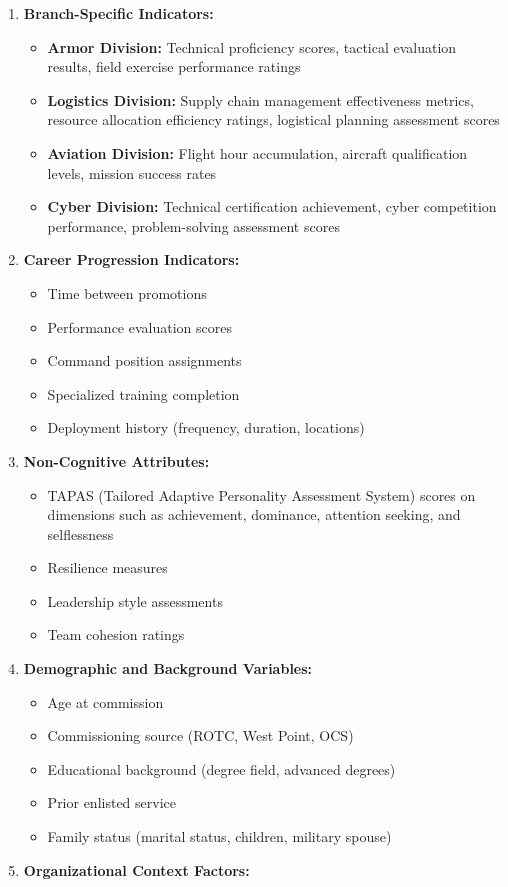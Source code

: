 \documentclass[
  letterpaper,
  DIV=11,
  numbers=noendperiod]{scrartcl}
\providecommand{\tightlist}{%
  \setlength{\itemsep}{0pt}\setlength{\parskip}{0pt}}
\begin{document}
\begin{enumerate}
\def\labelenumi{\arabic{enumi}.}
\tightlist
\item
  \textbf{Branch-Specific Indicators:}

  \begin{itemize}
  \tightlist
  \item
    \textbf{Armor Division:} Technical proficiency scores, tactical
    evaluation results, field exercise performance ratings
  \item
    \textbf{Logistics Division:} Supply chain management effectiveness
    metrics, resource allocation efficiency ratings, logistical planning
    assessment scores
  \item
    \textbf{Aviation Division:} Flight hour accumulation, aircraft
    qualification levels, mission success rates
  \item
    \textbf{Cyber Division:} Technical certification achievement, cyber
    competition performance, problem-solving assessment scores
  \end{itemize}
\item
  \textbf{Career Progression Indicators:}

  \begin{itemize}
  \tightlist
  \item
    Time between promotions
  \item
    Performance evaluation scores
  \item
    Command position assignments
  \item
    Specialized training completion
  \item
    Deployment history (frequency, duration, locations)
  \end{itemize}
\item
  \textbf{Non-Cognitive Attributes:}

  \begin{itemize}
  \tightlist
  \item
    TAPAS (Tailored Adaptive Personality Assessment System) scores on
    dimensions such as achievement, dominance, attention seeking, and
    selflessness
  \item
    Resilience measures
  \item
    Leadership style assessments
  \item
    Team cohesion ratings
  \end{itemize}
\item
  \textbf{Demographic and Background Variables:}

  \begin{itemize}
  \tightlist
  \item
    Age at commission
  \item
    Commissioning source (ROTC, West Point, OCS)
  \item
    Educational background (degree field, advanced degrees)
  \item
    Prior enlisted service
  \item
    Family status (marital status, children, military spouse)
  \end{itemize}
\item
  \textbf{Organizational Context Factors:}


\end{enumerate}
\end{document}
